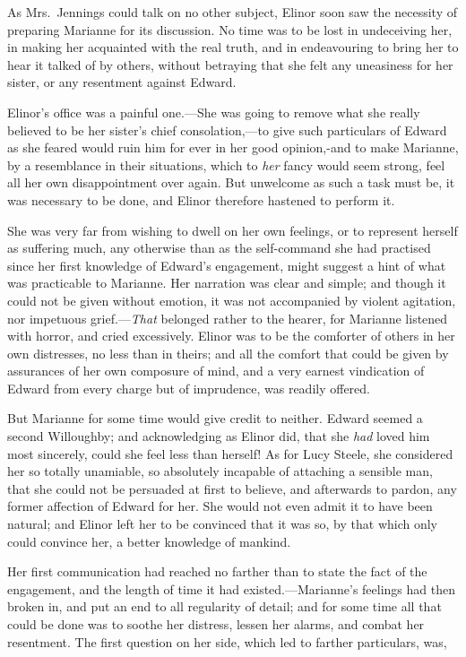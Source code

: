 As Mrs.\ Jennings could talk on no other subject,
Elinor soon saw the necessity of preparing Marianne for
its discussion.  No time was to be lost in undeceiving her,
in making her acquainted with the real truth, and in
endeavouring to bring her to hear it talked of by others,
without betraying that she felt any uneasiness for her sister,
or any resentment against Edward.

Elinor's office was a painful one.---She was going
to remove what she really believed to be her sister's
chief consolation,---to give such particulars of Edward as she
feared would ruin him for ever in her good opinion,-and
to make Marianne, by a resemblance in their situations,
which to \emph{her} fancy would seem strong, feel all her own
disappointment over again.  But unwelcome as such a task
must be, it was necessary to be done, and Elinor therefore
hastened to perform it.

She was very far from wishing to dwell on her own
feelings, or to represent herself as suffering much,
any otherwise than as the self-command she had practised
since her first knowledge of Edward's engagement, might
suggest a hint of what was practicable to Marianne.
Her narration was clear and simple; and though it could
not be given without emotion, it was not accompanied
by violent agitation, nor impetuous grief.---\emph{That} belonged
rather to the hearer, for Marianne listened with horror,
and cried excessively.  Elinor was to be the comforter
of others in her own distresses, no less than in theirs;
and all the comfort that could be given by assurances
of her own composure of mind, and a very earnest
vindication of Edward from every charge but of imprudence,
was readily offered.

But Marianne for some time would give credit to neither.
Edward seemed a second Willoughby; and acknowledging
as Elinor did, that she \emph{had} loved him most sincerely,
could she feel less than herself!  As for Lucy Steele,
she considered her so totally unamiable, so absolutely
incapable of attaching a sensible man, that she could
not be persuaded at first to believe, and afterwards
to pardon, any former affection of Edward for her.
She would not even admit it to have been natural;
and Elinor left her to be convinced that it was so,
by that which only could convince her, a better knowledge
of mankind.

Her first communication had reached no farther than
to state the fact of the engagement, and the length of time
it had existed.---Marianne's feelings had then broken in,
and put an end to all regularity of detail; and for some
time all that could be done was to soothe her distress,
lessen her alarms, and combat her resentment.  The first
question on her side, which led to farther particulars,
was,

